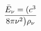 \documentclass[preview]{standalone}
\begin{document}
\begin{align*}
\bar{E}_{\nu}=( c ^{3}  \over 8 \pi \nu^{2}\big) \rho_{\nu}
\end{align*}
\end{document}
